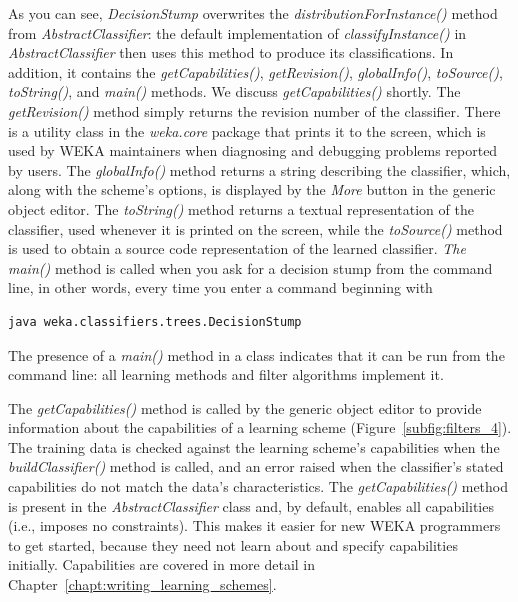 As you can see, \textit{DecisionStump} overwrites
the \textit{distributionForInstance()} method
from \textit{AbstractClassifier}: the default implementation
of \textit{classifyInstance()} in \textit{AbstractClassifier} then
uses this method to produce its classifications. In addition, it
contains the \textit{getCapabilities()}, \textit{getRevision()}, \textit{globalInfo()},
\textit{toSource()}, \textit{toString()}, and \textit{main()} methods. We discuss
\textit{getCapabilities()} shortly. The \textit{getRevision()} method simply returns the
revision number of the classifier. There is a utility class in the
\textit{weka.core} package that prints it to the screen, which is used by WEKA
maintainers when diagnosing and debugging problems reported by
users. The \textit{globalInfo()} method returns a string describing the
classifier, which, along with the scheme's options, is displayed by
the \textit{More} button in the generic object editor. The
\textit{toString()} method returns a textual representation of the classifier,
used whenever it is printed on the screen, while
the \textit{toSource()} method is used to obtain a source code
representation of the learned classifier. \textit{The main()} method is called
when you ask for a decision stump from the command line, in other
words, every time you enter a command beginning with

\begin{Verbatim}[fontsize=\footnotesize]
java weka.classifiers.trees.DecisionStump
\end{Verbatim}

\noindent The presence of a \textit{main()} method in a class indicates that it
can be run from the command line: all learning methods and filter
algorithms implement it.

The \textit{getCapabilities()} method is called by the generic object
editor to provide information about the capabilities of a learning
scheme (Figure~\ref{subfig:filters_4}). The training data is checked
against the learning scheme's capabilities when
the \textit{buildClassifier()} method is called, and an error raised
when the classifier's stated capabilities do not match the data's
characteristics. The \textit{getCapabilities()} method is present in
the \textit{AbstractClassifier} class and, by default, enables all
capabilities (i.e., imposes no constraints). This makes it easier for
new WEKA programmers to get started, because they need not learn about
and specify capabilities initially. Capabilities are covered in more
detail in Chapter~\ref{chapt:writing_learning_schemes}.

